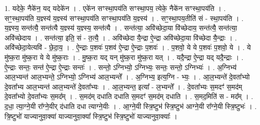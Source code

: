 \documentclass[17pt]{extarticle}
\begin{document}
1. यदेके॒ नैके॑न॒ यद् यदेके॑न । . एके॑न सꣳस्था॒पय॑ति सꣳस्था॒पय॒ त्येके॒ नैके॑न 
सꣳस्था॒पय॑ति । . सꣳ॒॒स्था॒पय॑ति य॒ज्ञ्स्य॑ य॒ज्ञ्स्य॑ सꣳस्था॒पय॑ति सꣳस्था॒पय॑ति य॒ज्ञ्स्य॑ । . सꣳ॒॒स्था॒पय॒तीति॑ सं - स्था॒पय॑ति । . य॒ज्ञ्स्य॒ सन्त॑त्यै॒ सन्त॑त्यै य॒ज्ञ्स्य॑ य॒ज्ञ्स्य॒ सन्त॑त्यै । . सन्त॑त्या॒ अवि॑च्छेदा॒या वि॑च्छेदाय॒ सन्त॑त्यै॒ सन्त॑त्या॒ अवि॑च्छेदाय । . सन्त॑त्या॒ इति॒ सं - त॒त्यै॒ । . अवि॑च्छेदा यै॒न्द्रा ऐ॒न्द्रा अवि॑च्छेदा॒या वि॑च्छेदा यै॒न्द्राः । . अवि॑च्छेदा॒येत्यवि॑ - छे॒दा॒य॒ । . ऐ॒न्द्राः प॒शवः॑ प॒शव॑ ऐ॒न्द्रा ऐ॒न्द्राः प॒शवः॑ । . प॒शवो॒ ये ये प॒शवः॑ प॒शवो॒ ये । . ये मु॑ष्क॒रा मु॑ष्क॒रा ये ये मु॑ष्क॒राः । . मु॒ष्क॒रा यद् यन् मु॑ष्क॒रा मु॑ष्क॒रा यत् । . यदै॒न्द्रा ऐ॒न्द्रा यद् यदै॒न्द्राः । . ऐ॒न्द्राः सन्तः॒ सन्त॑ ऐ॒न्द्रा ऐ॒न्द्राः सन्तः॑ । . सन्तो॒ ऽग्निभ्यो॒ ऽग्निभ्यः॒ सन्तः॒ सन्तो॒ ऽग्निभ्यः॑ । . अ॒ग्निभ्य॑ आल॒भ्यन्त॑ आल॒भ्यन्ते॒ ऽग्निभ्यो॒ ऽग्निभ्य॑ आल॒भ्यन्ते᳚ । . अ॒ग्निभ्य॒ इत्य॒ग्नि - भ्यः॒ । . आ॒ल॒भ्यन्ते॑ दे॒वता᳚भ्यो दे॒वता᳚भ्य आल॒भ्यन्त॑ आल॒भ्यन्ते॑ दे॒वता᳚भ्यः । . आ॒ल॒भ्यन्त॒ इत्या᳚ - ल॒भ्यन्ते᳚ । . दे॒वता᳚भ्यः स॒मदꣳ॑ स॒मद॑म् दे॒वता᳚भ्यो दे॒वता᳚भ्यः स॒मद᳚म् । . स॒मद॑म् दधाति दधाति स॒मदꣳ॑ स॒मद॑म् दधाति । . स॒मद॒मिति॑ स - मद᳚म् । . द॒धा॒ त्या॒ग्ने॒यी रा᳚ग्ने॒यीर् द॑धाति दधा त्याग्ने॒यीः । . आ॒ग्ने॒यी स्त्रि॒ष्टुभ॑ स्त्रि॒ष्टुभ॑ आग्ने॒यी रा᳚ग्ने॒यी स्त्रि॒ष्टुभः॑ । . त्रि॒ष्टुभो॑ याज्यानुवा॒क्या॑ याज्यानुवा॒क्या᳚ स्त्रि॒ष्टुभ॑ स्त्रि॒ष्टुभो॑ याज्यानुवा॒क्याः᳚ । \newline
\end{document}
